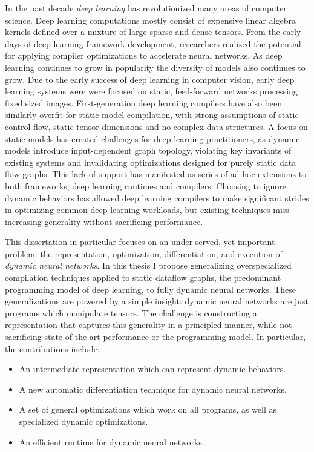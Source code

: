 \begin{fullwidth}
\begin{center}
\raggedright\setlength{\parindent}{1em}
In the past decade \emph{deep learning} has revolutionized many areas of
    computer science.
Deep learning computations mostly consist
    of expensive linear algebra kernels defined over a mixture
    of large sparse and dense tensors.
From the early days of deep learning framework development, researchers realized the
    potential for applying compiler optimizations to accelerate neural networks.
As deep learning continues to grow in popularity the diversity
    of models also continues to grow.
Due to the early success of deep learning in computer
    vision, early deep learning systems were were focused on static,
    feed-forward networks processing fixed sized images.
First-generation deep learning compilers have also been similarly overfit
    for static model compilation, with strong assumptions of static control-flow,
    static tensor dimensions and no complex data structures.
A focus on static models has created challenges for deep learning practitioners,
    as dynamic models introduce input-dependent graph topology,
    violating key invariants of existing systems and invalidating optimizations
    designed for purely static data flow graphs.
This lack of support has manifested as series of ad-hoc extensions to
  both frameworks, deep learning runtimes and compilers.
Choosing to ignore dynamic behaviors has allowed deep learning
    compilers to make significant strides in optimizing common
    deep learning workloads, but existing techniques miss
    increasing generality without sacrificing performance.

This dissertation in particular focuses on an under served, yet important problem:
  the representation,
  optimization,
  differentiation,
  and execution of \emph{dynamic neural networks}.
In this thesis I propose generalizing overspecialized
  compilation techniques applied to static dataflow graphs,
  the predominant programming model of deep learning,
  to fully dynamic neural networks.
These generalizations are powered by a simple insight:
  dynamic neural networks are just programs which manipulate tensors.
The challenge is constructing a representation that captures this generality
  in a principled manner, while not sacrificing state-of-the-art performance or the programming model.
In particular, the contributions include:
\begin{itemize}
    \item An intermediate representation which can represent dynamic behaviors.
    \item A new automatic differentiation technique for dynamic neural networks.
    \item A set of general optimizations which work on all programs, as well
          as specialized dynamic optimizations.
    \item An efficient runtime for dynamic neural networks.
\end{itemize}


\end{center}
\end{fullwidth}
